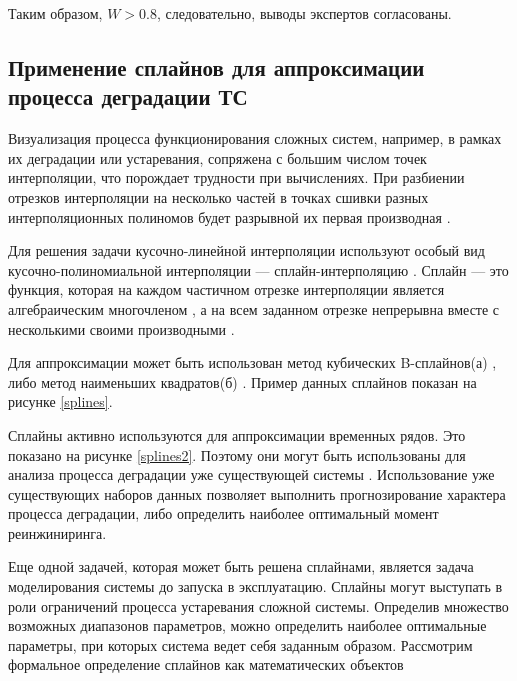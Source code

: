 Таким образом, $W>0.8$, следовательно, выводы экспертов согласованы.

\subsection{Применение сплайнов для аппроксимации процесса деградации ТС}
Визуализация процесса функционирования сложных систем, например, в рамках их деградации или устаревания, сопряжена с большим числом точек интерполяции, что порождает трудности при вычислениях. 
При разбиении отрезков интерполяции на несколько частей в точках сшивки разных интерполяционных полиномов будет разрывной их первая производная \cite{Splines}. 

Для решения задачи кусочно-линейной интерполяции используют особый вид кусочно-полиномиальной интерполяции ---
сплайн-интерполяцию \cite{Splines2}. 
Сплайн — это функция, которая на каждом частичном отрезке интерполяции является алгебраическим многочленом \cite{Pomax, Splines, Splines3}, 
а на всем заданном отрезке непрерывна вместе с несколькими своими производными \cite{Splines2,Splines3,Splines4}.

Для аппроксимации может быть использован метод кубических B-сплайнов(а) \cite{Splines5, Cubic1} , либо метод наименьших квадратов(б) \cite{Spline6, Cubic1}. 
Пример данных сплайнов показан на рисунке \ref{splines}.


Сплайны активно используются для аппроксимации временных рядов.
Это показано на рисунке \ref{splines2}. 
Поэтому они могут быть использованы для анализа процесса деградации уже существующей системы \cite{Doronina, Splines4, Spline6}. 
Использование уже существующих наборов данных позволяет выполнить прогнозирование характера процесса деградации, либо определить наиболее оптимальный момент реинжиниринга.


Еще одной задачей, которая может быть решена сплайнами, является задача моделирования системы до запуска в эксплуатацию. 
Сплайны могут выступать в роли ограничений процесса устаревания сложной системы. 
Определив множество возможных диапазонов параметров, можно определить наиболее оптимальные параметры, при которых система ведет себя заданным образом.
Рассмотрим формальное определение сплайнов как математических объектов

